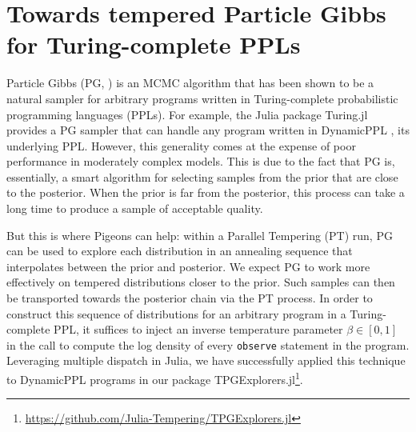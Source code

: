 \section{Towards tempered Particle Gibbs for Turing-complete PPLs}

Particle Gibbs (PG, \citealp{andrieu2010particle}) is an MCMC
algorithm that has been shown \citep{wood2014new} to be a natural sampler for
arbitrary programs written in Turing-complete probabilistic programming 
languages (PPLs). For example, the Julia package Turing.jl \citep{ge2018turing}
provides a PG sampler that can handle any program written in DynamicPPL
\citep{tarek2020dynamicppl}, its underlying PPL.
However, this generality comes at the expense of poor performance in moderately
complex models. This is due to the fact that PG is, essentially, a smart 
algorithm for selecting samples from the prior that are close to the posterior.
When the prior is far from the posterior, this process can take a long time to
produce a sample of acceptable quality.

But this is where Pigeons can help: within a Parallel Tempering (PT) run, PG can be
used to explore each distribution in an annealing sequence that interpolates between
the prior and posterior. We expect PG to work more effectively on tempered 
distributions closer to the prior. Such samples can then be transported towards 
the posterior chain via the PT process.
In order to construct this sequence of distributions for an arbitrary program in
a Turing-complete PPL, it suffices to inject an inverse temperature parameter 
$\beta\in[0,1]$ in the call to compute the log density of every \texttt{observe} 
statement in the program. Leveraging multiple dispatch in Julia, we have
successfully applied this technique to DynamicPPL programs in our package
TPGExplorers.jl\footnote{\url{https://github.com/Julia-Tempering/TPGExplorers.jl}}.
